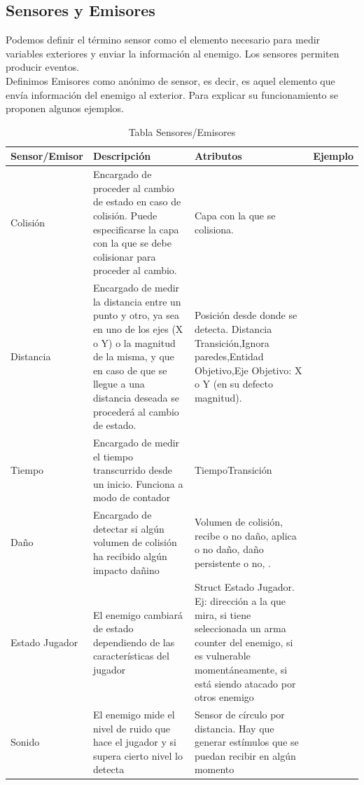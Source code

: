 \subsection{Sensores y Emisores}
Podemos definir el término sensor como el elemento necesario para medir variables exteriores y enviar la información al enemigo. Los sensores permiten producir eventos. \\
Definimos Emisores como anónimo de sensor, es decir, es aquel elemento que envía información del enemigo al exterior.
Para explicar su funcionamiento se proponen algunos ejemplos.
\begin{table}
	\centering
	\begin{tabular}{|p{3cm}|p{4.5cm}|p{4cm}|p{3cm}|}
	\hline
	\textbf{Sensor/Emisor} & \textbf{Descripción} & \textbf{Atributos} & \textbf{Ejemplo} \\ 
	\hline
	Colisión  & Encargado de proceder al cambio de estado en caso de colisión. Puede especificarse la capa con la que se debe colisionar para proceder al cambio. &Capa con la que se colisiona. \\ 
	\hline
	Distancia & Encargado de medir la distancia entre un punto y otro, ya sea en uno de los ejes (X o Y) o la magnitud de la misma, y que en caso de que se llegue a una distancia deseada se procederá al cambio de estado.& Posición desde donde se detecta. Distancia Transición,Ignora paredes,Entidad Objetivo,Eje Objetivo: X o Y (en su defecto magnitud).  \\ 
	\hline
	Tiempo &Encargado de medir el tiempo transcurrido desde un inicio. Funciona a modo de contador &TiempoTransición \\ 
	\hline
	Daño &Encargado de detectar si algún volumen de colisión ha recibido algún impacto dañino &Volumen de colisión, recibe o no daño, aplica o no daño, daño persistente o no, . \\ 
	\hline
	Estado Jugador &El enemigo cambiará de estado dependiendo de las características del jugador & Struct Estado Jugador.
Ej: dirección a la que mira, si tiene seleccionada un arma counter del enemigo, si es vulnerable momentáneamente, si está siendo atacado por otros enemigo \\ 
	\hline
	Sonido &El enemigo mide el nivel de ruido que hace el jugador  y si supera cierto nivel lo detecta & Sensor de círculo por distancia. Hay que generar estímulos que se puedan recibir en algún momento\\ 
	\hline
	\end{tabular}
	\caption{Tabla Sensores/Emisores}
	\label{tab:Sensores/Emisores}
\end{table}
